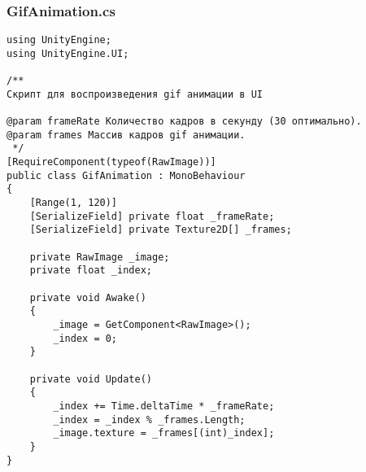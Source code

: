 \subsubsection*{GifAnimation.cs}
\begin{verbatim}
﻿using UnityEngine;
using UnityEngine.UI;

/**
Скрипт для воспроизведения gif анимации в UI

@param frameRate Количество кадров в секунду (30 оптимально).
@param frames Массив кадров gif анимации.
 */
[RequireComponent(typeof(RawImage))]
public class GifAnimation : MonoBehaviour
{
    [Range(1, 120)]
    [SerializeField] private float _frameRate;
    [SerializeField] private Texture2D[] _frames;

    private RawImage _image;
    private float _index;

    private void Awake()
    {
        _image = GetComponent<RawImage>();
        _index = 0;
    }

    private void Update()
    {
        _index += Time.deltaTime * _frameRate;
        _index = _index % _frames.Length;
        _image.texture = _frames[(int)_index];
    }
}

\end{verbatim}
